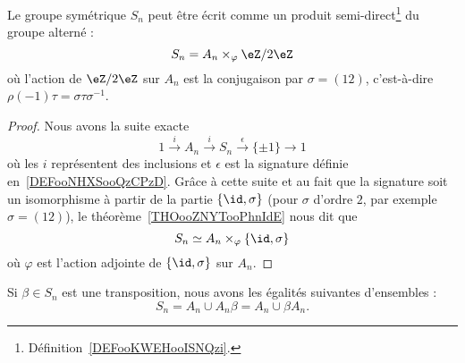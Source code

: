 \begin{proposition}      \label{PROPooPSZVooSmAgPA}
	Le groupe symétrique \( S_n\) peut être écrit comme un produit semi-direct\footnote{Définition~\ref{DEFooKWEHooISNQzi}.} du groupe alterné :
	\begin{equation}
		S_n=A_n\times_{\varphi}\eZ/2\eZ
	\end{equation}
	où l'action de \( \eZ/2\eZ\) sur \( A_n\) est la conjugaison par \( \sigma=(12)\), c'est-à-dire \( \rho(-1)\tau=\sigma\tau\sigma^{-1}\).
\end{proposition}

\begin{proof}
	Nous avons la suite exacte
	\begin{equation}
		1\stackrel{i}{\longrightarrow}A_n\stackrel{i}{\longrightarrow}S_n\stackrel{\epsilon}{\longrightarrow}\{ \pm 1 \}\longrightarrow 1
	\end{equation}
	où les \( i\) représentent des inclusions et \( \epsilon\) est la signature définie en~\ref{DEFooNHXSooQzCPzD}. Grâce à cette suite et au fait que la signature soit un isomorphisme à partir de la partie \( \{ \id,\sigma \}\) (pour \( \sigma\) d'ordre \( 2\), par exemple \( \sigma=(12)\)), le théorème~\ref{THOooZNYTooPhnIdE} nous dit que
	\begin{equation}
		S_n\simeq A_n\times_{\varphi}\{ \id,\sigma \}
	\end{equation}
	où \( \varphi\) est l'action adjointe de \( \{ \id,\sigma \}\) sur \( A_n\).
\end{proof}

\begin{proposition}     \label{PROPooZOWBooIMxxlj}
	Si \( \beta\in S_n\) est une transposition, nous avons les égalités suivantes d'ensembles :
	\begin{equation}
		S_n=A_n\cup A_n\beta=A_n\cup \beta A_n.
	\end{equation}
\end{proposition}

